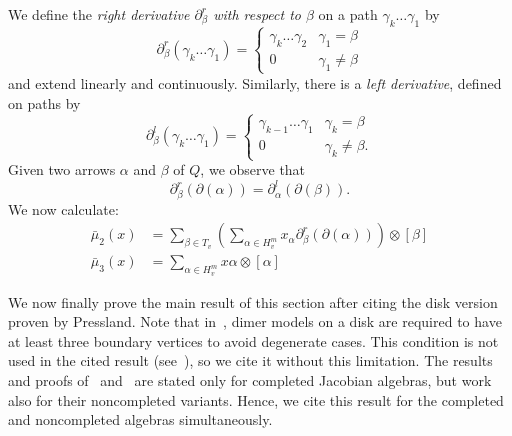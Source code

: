 \documentclass{article}
\theoremstyle{definition}
\begin{document}
We define the \textit{right derivative $\partial_\beta^r$ with respect to $\beta$} on a path $\gamma_k\dots\gamma_1$ by
\[\partial_\beta^r(\gamma_k\dots\gamma_1)=\begin{cases}\gamma_k\dots\gamma_2&\gamma_1=\beta\\0&\gamma_1\neq\beta\end{cases}\]
and extend linearly and continuously. Similarly, there is a \textit{left derivative}, defined on paths by
\[\partial_\beta^l(\gamma_k\dots\gamma_1)=\begin{cases}\gamma_{k-1}\dots\gamma_1&\gamma_k=\beta\\0&\gamma_k\neq\beta.\end{cases}\]
Given two arrows $\alpha$ and $\beta$ of $Q$, we observe that
\[\partial_\beta^r(\partial(\alpha))=\partial_\alpha^l(\partial(\beta)).\]
We now calculate:
\begin{align*}
	\bar\mu_2(x)&=\sum_{\beta\in T_v}\left(\sum_{\alpha\in H_v^m}x_\alpha\partial_\beta^r(\partial(\alpha))\right)\otimes[\beta]\\
	\bar\mu_3(x)&=\sum_{\alpha\in H_v^{m}}x\alpha\otimes[\alpha]
\end{align*}

We now finally prove the main result of this section after citing the disk version proven by Pressland.
Note that in~\cite{XPressland2019}, dimer models on a disk are required to have at least three boundary vertices to avoid degenerate cases. This condition is not used in the cited result (see~\cite[Remark 2.2]{XPressland2019}), so we cite it without this limitation. {The results and proofs of~\cite[Theorem 5.6]{XPressland2015} and~\cite[Theorem 3.7]{XPressland2019} are stated only for completed Jacobian algebras, but work also for their noncompleted variants. Hence, we cite this result for the completed and noncompleted algebras simultaneously.}
\end{document}
